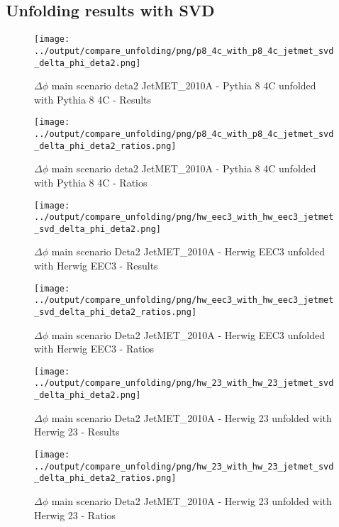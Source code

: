 \documentclass[11pt]{book}
\begin{document}
\clearpage
\subsection{Unfolding results with SVD}

\begin{figure}[ht]
\centering
\texttt{[image: ../output/compare\_unfolding/png/p8\_4c\_with\_p8\_4c\_jetmet\_svd\_delta\_phi\_deta2.png]}
\caption{$\Delta\phi$ main scenario deta2 JetMET\_2010A - Pythia 8 4C unfolded with Pythia 8 4C - Results}
\label{p8_p8_jetmet_svd_delta_phi_deta2_a}
\end{figure}

\begin{figure}[ht]
\centering
\texttt{[image: ../output/compare\_unfolding/png/p8\_4c\_with\_p8\_4c\_jetmet\_svd\_delta\_phi\_deta2\_ratios.png]}
\caption{$\Delta\phi$ main scenario deta2 JetMET\_2010A - Pythia 8 4C unfolded with Pythia 8 4C - Ratios}
\label{p8_p8_jetmet_svd_delta_phi_deta2_b}
\end{figure}

\begin{figure}[ht]
\centering
\texttt{[image: ../output/compare\_unfolding/png/hw\_eec3\_with\_hw\_eec3\_jetmet\_svd\_delta\_phi\_deta2.png]}
\caption{$\Delta\phi$ main scenario Deta2 JetMET\_2010A - Herwig EEC3 unfolded with Herwig EEC3 - Results}
\label{hw_eec3_hw_eec3_jetmet_svd_delta_phi_deta2_a}
\end{figure}

\begin{figure}[ht]
\centering
\texttt{[image: ../output/compare\_unfolding/png/hw\_eec3\_with\_hw\_eec3\_jetmet\_svd\_delta\_phi\_deta2\_ratios.png]}
\caption{$\Delta\phi$ main scenario Deta2 JetMET\_2010A - Herwig EEC3 unfolded with Herwig EEC3 - Ratios}
\label{hw_eec3_hw_eec3_jetmet_svd_delta_phi_deta2_b}
\end{figure}

\begin{figure}[ht]
\centering
\texttt{[image: ../output/compare\_unfolding/png/hw\_23\_with\_hw\_23\_jetmet\_svd\_delta\_phi\_deta2.png]}
\caption{$\Delta\phi$ main scenario Deta2 JetMET\_2010A - Herwig 23 unfolded with Herwig 23 - Results}
\label{hw_23_hw_23_jetmet_svd_delta_phi_deta2_a}
\end{figure}

\begin{figure}[ht]
\centering
\texttt{[image: ../output/compare\_unfolding/png/hw\_23\_with\_hw\_23\_jetmet\_svd\_delta\_phi\_deta2\_ratios.png]}
\caption{$\Delta\phi$ main scenario Deta2 JetMET\_2010A - Herwig 23 unfolded with Herwig 23 - Ratios}
\label{hw_23_hw_23_jetmet_svd_delta_phi_deta2_b}
\end{figure}
\end{document}
